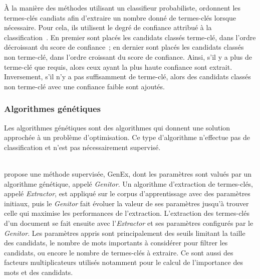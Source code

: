         À la manière des méthodes utilisant un classifieur probabiliste,
         ordonnent les termes-clés candiats
        afin d'extraire un nombre donné de termes-clés lorsque nécessaire. Pour
        cela, ils utilisent le degré de confiance attribué à la
        classification~\cite{denker1991neuralnetprobability}. En premier sont
        placés les candidats classés \og{}terme-clé\fg{}, dans l'ordre
        décroissant du score de confiance~; en dernier sont placés les candidats
        classés \og{}non terme-clé\fg{}, dans l'ordre croissant du score
        de confiance. Ainsi, s'il y a plus de \og{}terme-clé\fg{} que requis,
        alors ceux ayant la plus haute confiance sont extrait. Inversement, s'il
        n'y a pas suffisamment de \og{}terme-clé\fg{}, alors des candidats
        classés \og{}non terme-clé\fg{} avec une confiance faible sont ajoutés.

      \subsubsection{Algorithmes génétiques}
      \label{subsubsec:main-state_of_the_art-automatic_keyphrase_extraction-supervised_keyphrase_extraction-genex}
        Les algorithmes génétiques sont des algorithmes qui donnent une solution
        approchée à un problème d'optimisation. Ce type d'algorithme
        n'effectue pas de classification et n'est pas nécessairement supervisé.

        ~\\ propose une méthode
        supervisée, GenEx, dont les paramètres sont valués par un algorithme
        génétique, appelé \textit{Genitor}. Un algorithme d'extraction de
        termes-clés, appelé \textit{Extractor}, est appliqué sur le corpus
        d'apprentissage avec des paramètres initiaux, puis le \textit{Genitor}
        fait évoluer la valeur de ses paramètres jusqu'à trouver celle qui
        maximise les performances de l'extraction. L'extraction des termes-clés
        d'un document se fait ensuite avec l'\textit{Extractor} et ses
        paramètres configurés par le \textit{Genitor}. Les paramètres appris
        sont principalement des seuils limitant la taille des candidats, le
        nombre de mots importants à considérer pour filtrer les candidats, ou
        encore le nombre de termes-clés à extraire. Ce sont aussi des facteurs
        multiplicateurs utilisés notamment pour le calcul de l'importance des
        mots et des candidats.


